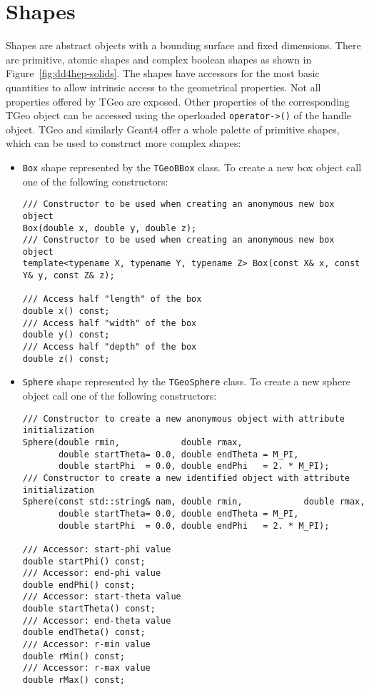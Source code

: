 \section{Shapes}
\label{dd4hep-basic-shapes}

Shapes are abstract objects with a bounding surface and fixed dimensions.  There are primitive, atomic shapes and complex boolean shapes as shown in Figure~\ref{fig:dd4hep-solids}. The shapes have accessors for the most basic quantities to allow intrinsic access to the geometrical properties. Not all properties offered by TGeo are exposed. Other properties of the corresponding TGeo object can be accessed using the operloaded \texttt{operator->()} of the handle object. TGeo and similarly Geant4 offer a whole palette of primitive shapes, which can be used to construct more complex shapes:
\begin{itemize}
\item \texttt{Box} shape represented by the \texttt{TGeoBBox} class. To create a new box object call one of the following constructors:
\begin{verbatim}
/// Constructor to be used when creating an anonymous new box object
Box(double x, double y, double z);
/// Constructor to be used when creating an anonymous new box object
template<typename X, typename Y, typename Z> Box(const X& x, const Y& y, const Z& z);

/// Access half "length" of the box
double x() const;
/// Access half "width" of the box
double y() const;
/// Access half "depth" of the box
double z() const;
\end{verbatim}
\item \texttt{Sphere} shape represented by the \texttt{TGeoSphere} class. To create a new sphere object call one of the following constructors:
\begin{verbatim}
/// Constructor to create a new anonymous object with attribute initialization
Sphere(double rmin,            double rmax,
       double startTheta= 0.0, double endTheta = M_PI,
       double startPhi  = 0.0, double endPhi   = 2. * M_PI);
/// Constructor to create a new identified object with attribute initialization
Sphere(const std::string& nam, double rmin,            double rmax,
       double startTheta= 0.0, double endTheta = M_PI,
       double startPhi  = 0.0, double endPhi   = 2. * M_PI);

/// Accessor: start-phi value
double startPhi() const;
/// Accessor: end-phi value 
double endPhi() const;
/// Accessor: start-theta value
double startTheta() const;
/// Accessor: end-theta value
double endTheta() const;
/// Accessor: r-min value
double rMin() const;
/// Accessor: r-max value
double rMax() const;
\end{verbatim}


\end{itemize}
